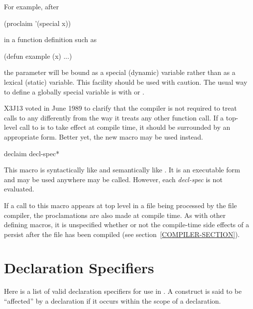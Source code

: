 \begin{defun}[Function]
For example, after
\begin{lisp}
(proclaim '(special x))
\end{lisp}
in a function definition such as
\begin{lisp}
(defun example (x) ...)
\end{lisp}
the parameter  will be bound as a special (dynamic) variable
rather than as a lexical (static) variable.  This facility should
be used with caution.  The usual way to define a globally special
variable is with  or .
\end{defun}

\begin{newer}
X3J13 voted in June 1989 
to clarify that the compiler is not required to treat
calls to  any differently from the way it treats
any other function call.  If a top-level call to 
is to take effect at compile time, it should be surrounded
by an appropriate  form.  Better yet,
the new macro  may be used instead.

\begin{defmac}
declaim {decl-spec}*

This macro is syntactically like  and semantically
like .  It is an executable form and may be used
anywhere  may be called.  However, each {\it decl-spec}
is not evaluated.

If a call to this macro appears at top level in a file
  being processed by the file compiler, the proclamations are also
  made at compile time.  As with other defining macros, it is 
  unspecified whether or not the compile-time side effects of a 
   persist after the file has been compiled
  (see section~\ref{COMPILER-SECTION}).
\end{defmac}
\end{newer}

\section{Declaration Specifiers}
\label{DECLARATION-SPECIFIERS-SECTION}

Here is a list of valid declaration specifiers for use in
.  A construct is said to be ``affected'' by a declaration
if it occurs within the scope of a declaration.

